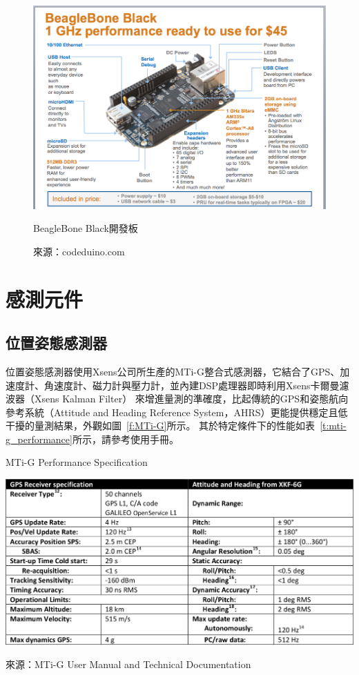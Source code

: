 \begin{figure}[h!]
	\centering
	\includegraphics[width=\textwidth]{figures/beagleboneblack-specs}
	\caption{BeagleBone Black開發板}
	\caption*{來源：codeduino.com}
	\label{f:beagleboneblack-specs}
\end{figure}

\section{感測元件}
\subsection{位置姿態感測器}
位置姿態感測器使用Xsens公司所生產的MTi-G整合式感測器，它結合了GPS、加速度計、角速度計、磁力計與壓力計，並內建DSP處理器即時利用Xsens卡爾曼濾波器（Xsens Kalman Filter）
來增進量測的準確度，比起傳統的GPS和姿態航向參考系統（Attitude and Heading Reference System，AHRS）更能提供穩定且低干擾的量測結果，外觀如圖~\ref{f:MTi-G}所示。
其於特定條件下的性能如表~\ref{t:mti-g_performance}所示，請參考使用手冊\cite{Xsens:2012:MTiG_Manual}。

\begin{table}[h!]
	\centering
	\caption{MTi-G Performance Specification}
	\label{t:mti-g_performance}
	\includegraphics[width=\textwidth]{tables/MTi-G_Performance}
	\caption*{來源：MTi-G User Manual and Technical Documentation\cite{Xsens:2012:MTiG_Manual}}
\end{table}

